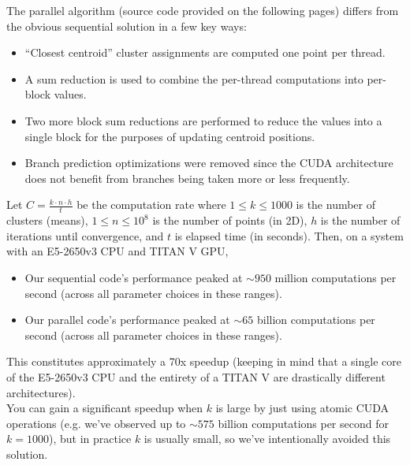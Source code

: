 \documentclass{article}
\begin{document}
	
	The parallel algorithm (source code provided on the following pages) differs from the obvious sequential solution in a few key ways:
	\begin{itemize}
		\item ``Closest centroid'' cluster assignments are computed one point per thread.
		\item A sum reduction is used to combine the per-thread computations into per-block values.
		\item Two more block sum reductions are performed to reduce the values into a single block for the purposes of updating centroid positions.
		\item Branch prediction optimizations were removed since the CUDA architecture does not benefit from branches being taken more or less frequently.
	\end{itemize}

	Let $C = \frac{k \cdot n \cdot h}{t}$ be the computation rate where $1 \leq k \leq 1000$ is the number of clusters (means), $1 \leq n \leq 10^8$ is the number of points (in 2D), $h$ is the number of iterations until convergence, and $t$ is elapsed time (in seconds). Then, on a system with an E5-2650v3 CPU and TITAN V GPU,
	\begin{itemize}
		\item Our sequential code's performance peaked at ${\sim} 950$ million computations per second (across all parameter choices in these ranges).
		\item Our parallel code's performance peaked at ${\sim} 65$ billion computations per second (across all parameter choices in these ranges).
	\end{itemize}
	This constitutes approximately a 70x speedup (keeping in mind that a single core of the E5-2650v3 CPU and the entirety of a TITAN V are drastically different architectures).\\
	
	You can gain a significant speedup when $k$ is large by just using atomic CUDA operations (e.g. we've observed up to ${\sim}575$ billion computations per second for $k=1000$), but in practice $k$ is usually small, so we've intentionally avoided this solution.
	
\end{document}
